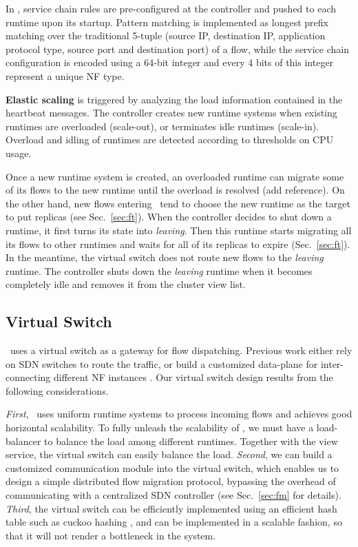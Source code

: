 In \nfactor, service chain rules are
pre-configured at the controller and pushed to each runtime upon its startup. Pattern matching is implemented as
longest prefix matching over the traditional 5-tuple (source IP,
destination IP, application protocol type, source port and destination port) of a flow,
while the service chain configuration is encoded using a 64-bit integer and every
4 bits of this integer represent a unique NF type.

\textbf{Elastic scaling} is triggered by analyzing the load information
contained in the heartbeat messages. The controller creates new runtime systems when existing runtimes are overloaded (scale-out), or terminates idle runtimes (scale-in). Overload and idling of runtimes are detected according to thresholds on CPU usage.

Once a new runtime system is created, an overloaded runtime can migrate some of its flows to the new runtime until the overload is resolved (add reference). On the other hand, new flows entering \nfactor~tend to choose the new runtime as the target to put replicas (see Sec.~\ref{sec:ft}). When the controller decides to shut down a runtime, it first turns its state into \textit{leaving}. Then this runtime starts migrating all its flows to other runtimes and waits for all of its replicas to expire (Sec.~\ref{sec:ft}). In the meantime, the virtual switch does not route new flows to the \textit{leaving} runtime. The controller shuts down the \textit{leaving} runtime when it becomes completely idle and removes it from the cluster view list. 

\subsection{Virtual Switch}
\label{sec:vswitch}

\nfactor~uses a virtual switch as a gateway for flow dispatching. Previous work either rely on SDN switches \cite{gember2012stratos, gember2015opennf} to route the traffic, or build a customized data-plane for inter-connecting different NF instances \cite{palkar2015e2}. Our virtual switch design results from the following considerations.


\textit{First}, \nfactor~uses uniform runtime systems to process incoming flows and achieves good horizontal scalability. To fully unleash the scalability of \nfactor, we must have a load-balancer to balance the load among different runtimes. Together with the view service, the virtual switch can easily balance the load. \textit{Second}, we can build a customized communication module into the virtual switch, which enables us to design a simple distributed flow migration protocol, bypassing the overhead of communicating with a centralized SDN controller (see Sec.~\ref{sec:fm} for details). \textit{Third}, the virtual switch can be efficiently implemented using an efficient hash table such as cuckoo hashing \cite{pagh2001cuckoo}, and can be implemented in a scalable fashion, so that it will not render a bottleneck in the system. 

